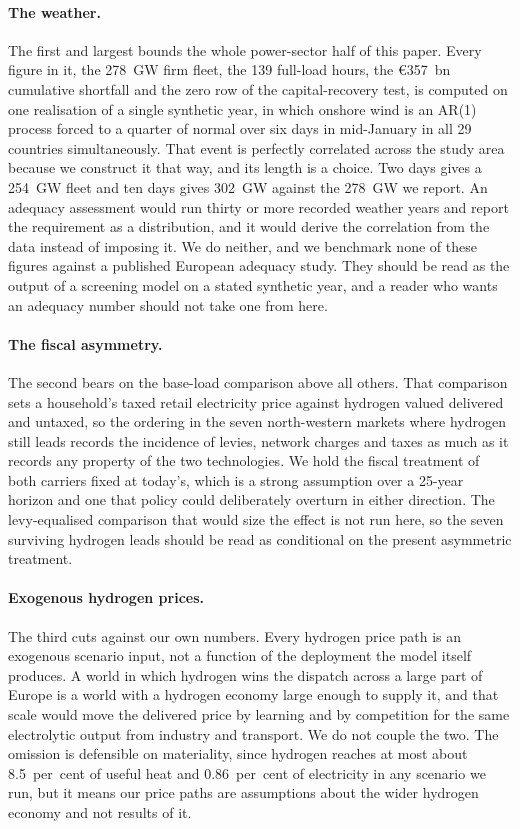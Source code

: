\paragraph{The weather.} The first and largest bounds the whole power-sector half of this
paper. Every figure in it, the 278~GW firm fleet, the 139 full-load hours, the
\euro{}357~bn cumulative shortfall and the zero row of the capital-recovery test, is
computed on one realisation of a single synthetic year, in which onshore wind is an AR(1)
process forced to a quarter of normal over six days in mid-January in all 29 countries
simultaneously. That event is perfectly correlated across the study area because we
construct it that way, and its length is a choice. Two days gives a 254~GW fleet and ten
days gives 302~GW against the 278~GW we report. An adequacy assessment would run thirty
or more recorded weather years and report the requirement as a distribution, and it would
derive the correlation from the data instead of imposing it. We do neither, and we
benchmark none of these figures against a published European adequacy study. They should
be read as the output of a screening model on a stated synthetic year, and a reader who
wants an adequacy number should not take one from here.

\paragraph{The fiscal asymmetry.} The second bears on the base-load comparison above all
others. That comparison sets a household's taxed retail electricity price against
hydrogen valued delivered and untaxed, so the ordering in the seven north-western
markets where hydrogen still leads records the incidence of levies, network charges and
taxes as much as it records any property of the two technologies. We hold the fiscal
treatment of both carriers fixed at today's, which is a strong assumption over a 25-year
horizon and one that policy could deliberately overturn in either direction. The
levy-equalised comparison that would size the effect is not run here, so the seven
surviving hydrogen leads should be read as conditional on the present asymmetric
treatment.

\paragraph{Exogenous hydrogen prices.} The third cuts against our own numbers. Every hydrogen price path is an exogenous scenario input, not a function
of the deployment the model itself produces. A world in which hydrogen wins the dispatch
across a large part of Europe is a world with a hydrogen economy large enough to supply
it, and that scale would move the delivered price by learning and by competition for the
same electrolytic output from industry and transport. We do not couple the two. The
omission is defensible on materiality, since hydrogen reaches at most about 8.5~per~cent of useful heat and 0.86~per~cent of
electricity in any scenario we run, but it means our
price paths are assumptions about the wider hydrogen economy and not results of it.

